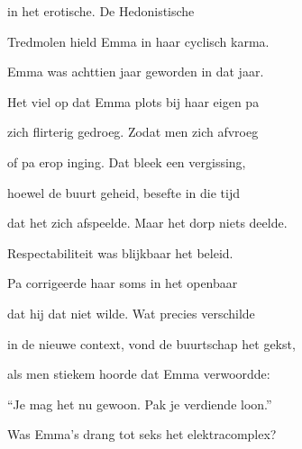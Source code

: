 in het erotische.
De Hedonistische

Tredmolen hield Emma
in haar cyclisch karma.

Emma was achttien jaar
geworden in dat jaar.

Het viel op dat Emma
plots bij haar eigen pa

zich flirterig gedroeg.
Zodat men zich afvroeg

of pa erop inging.
Dat bleek een vergissing,

hoewel de buurt geheid,
besefte in die tijd

dat het zich afspeelde.
Maar het dorp niets deelde.

Respectabiliteit
was blijkbaar het beleid.

Pa corrigeerde haar
soms in het openbaar

dat hij dat niet wilde.
Wat precies verschilde

in de nieuwe context,
vond de buurtschap het gekst,

als men stiekem hoorde
dat Emma verwoordde:

“Je mag het nu gewoon.
Pak je verdiende loon.”

Was Emma’s drang tot seks
het elektracomplex?
